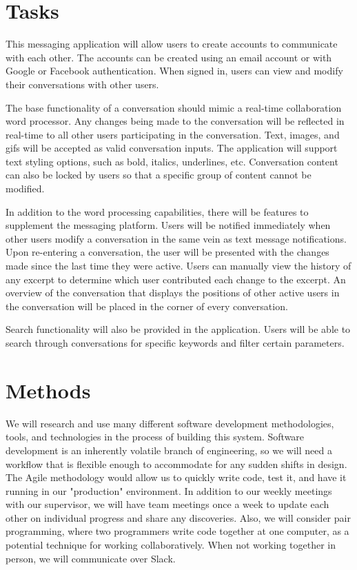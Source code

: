 \documentclass[letterpaper]{report}
\begin{document}
	\section*{Tasks}
	\markright{}
	This messaging application will allow users to create accounts to
	communicate with each other. The accounts can be created using an email
	account or with Google or Facebook authentication. When signed in, users
	can view and modify their conversations with other users.

	The base functionality of a conversation should mimic a real-time
	collaboration word processor. Any changes being made to the conversation
	will be reflected in real-time to all other users participating in the
	conversation. Text, images, and gifs will be accepted as valid conversation
	inputs. The application will support text styling options, such as bold,
	italics, underlines, etc. Conversation content can also be locked by users
	so that a specific group of content cannot be modified.

	In addition to the word processing capabilities, there will be features to
	supplement the messaging platform.  Users will be notified immediately when
	other users modify a conversation in the same vein as text message
	notifications. Upon re-entering a conversation, the user will be presented
	with the changes made since the last time they were active. Users can
	manually view the history of any excerpt to determine which user
	contributed each change to the excerpt. An overview of the conversation
	that displays the positions of other active users in the conversation will
	be placed in the corner of every conversation.

	Search functionality will also be provided in the application. Users will
	be able to search through conversations for specific keywords and filter
	certain parameters.

	\section*{Methods}
	\markright{}
	We will research and use many different software development methodologies,
	tools, and technologies in the process of building this system. Software
	development is an inherently volatile branch of engineering, so we will
	need a workflow that is flexible enough to accommodate for any sudden shifts
	in design. The Agile methodology would allow us to quickly write code, test
	it, and have it running in our "production" environment. In addition to our
	weekly meetings with our supervisor, we will have team meetings once a week
	to update each other on individual progress and share any discoveries.
	Also, we will consider pair programming, where two programmers write code
	together at one computer, as a potential technique for working
	collaboratively. When not working together in person, we will communicate
	over Slack.
\end{document}
